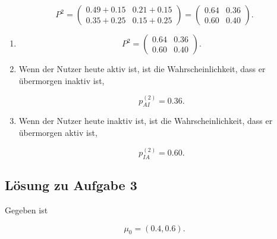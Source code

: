 \documentclass[11pt,a4paper]{article}
\begin{document}
\[
P^2 =
\begin{pmatrix}
0.49+0.15 & 0.21+0.15 \\
0.35+0.25 & 0.15+0.25
\end{pmatrix}
=
\begin{pmatrix}
0.64 & 0.36 \\
0.60 & 0.40
\end{pmatrix}.
\]

\begin{enumerate}
    \item
    \[
    P^2 =
    \begin{pmatrix}
    0.64 & 0.36 \\
    0.60 & 0.40
    \end{pmatrix}.
    \]

    \item Wenn der Nutzer heute aktiv ist, ist die Wahrscheinlichkeit, dass er übermorgen inaktiv ist,

    \[
    p_{AI}^{(2)} = 0.36.
    \]

    \item Wenn der Nutzer heute inaktiv ist, ist die Wahrscheinlichkeit, dass er übermorgen aktiv ist,

    \[
    p_{IA}^{(2)} = 0.60.
    \]
\end{enumerate}

\subsection*{Lösung zu Aufgabe 3}

Gegeben ist

\[
\mu_0 = (0.4,0.6).
\]
\end{document}
